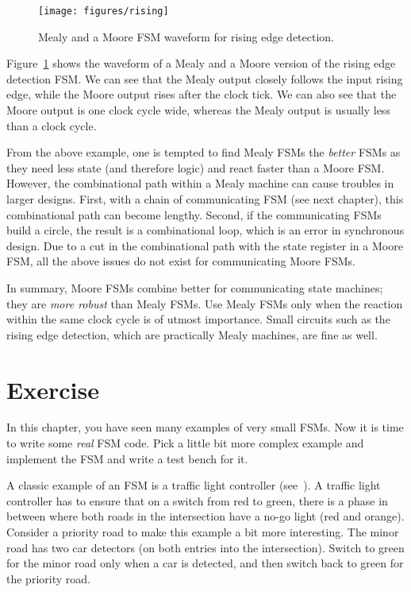 \documentclass[%
    10pt,
    headinclude, footexclude,
    openright, %
    notitlepage,
    cleardoubleempty,
    headsepline,
    pointlessnumbers,
    bibtotoc, idxtotoc,
    ]{scrbook}
\begin{document}
\begin{figure}
  \centering
  \texttt{[image: figures/rising]}
  \caption{Mealy and a  Moore FSM waveform for rising edge detection.}
  \label{fig:rising}
\end{figure}

Figure~\ref{fig:rising} shows the waveform of a Mealy and a  Moore version
of the rising edge detection FSM. We can see that the Mealy output closely
follows the input rising edge, while the Moore output rises after the clock tick.
We can also see that the Moore output is one clock cycle wide, whereas the Mealy
output is usually less than a clock cycle.

From the above example, one is tempted to find Mealy FSMs the \emph{better}
FSMs as they need less state (and therefore logic) and react faster than a Moore FSM.
However, the combinational path within a Mealy machine can cause troubles in
larger designs. First, with a chain of communicating FSM (see next chapter), this
combinational path can become lengthy. Second, if the communicating FSMs build
a circle, the result is a combinational loop, which is an error in synchronous design.
Due to a cut in the combinational path with the state register in a Moore FSM,
all the above issues do not exist for communicating Moore FSMs.

In summary, Moore FSMs combine better for communicating state machines; they
are \emph{more robust} than Mealy FSMs. Use Mealy FSMs only when the reaction within the same
clock cycle is of utmost importance. Small circuits such as the rising edge detection,
which are practically Mealy machines, are fine as well.

\section{Exercise}

In this chapter, you have seen many examples of very small FSMs.
Now it is time to write some \emph{real} FSM code.
Pick a little bit more complex example and implement the FSM and
write a test bench for it.

A classic example of an FSM is a traffic light controller (see~\cite[Section~14.3]{dally:vhdl:2016}).
A traffic light controller has to ensure that on a switch from red to green,
there is a phase in between where both roads in the intersection
have a no-go light (red and orange).
Consider a priority road to make this example a bit more interesting.
The minor road has two car detectors (on both entries into the intersection).
Switch to green for the minor road only when a car is detected, and then switch
back to green for the priority road.
\end{document}
